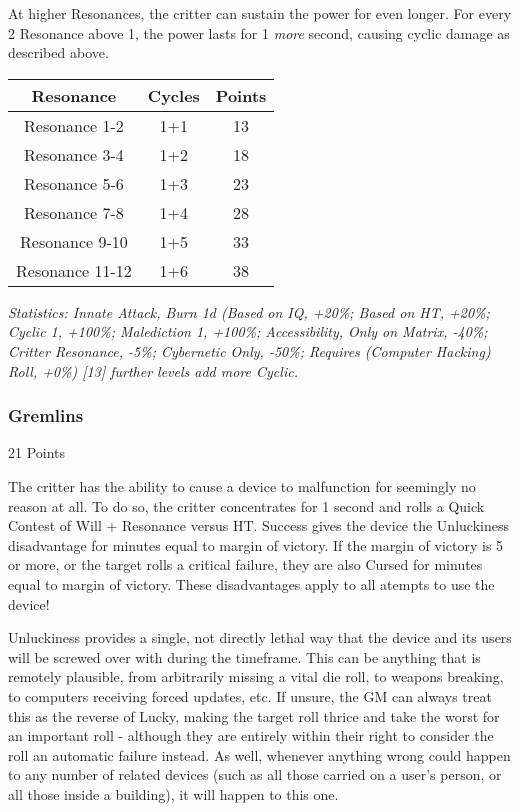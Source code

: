 \begin{multicols*}{3}
	At higher Resonances, the critter can sustain the power for even longer. For every 2 Resonance above 1, the power lasts for 1 \textit{more} second, causing cyclic damage as described above.
	
	 	\begin{center}
	 	\begin{tabular}{|c|c|c|}
	 		\hline
	 		Resonance & Cycles & Points \\
	 		\hline
	 		\hline
	 		Resonance 1-2 & 1+1 & 13 \\
	 		Resonance 3-4 & 1+2 & 18 \\
	 		Resonance 5-6 & 1+3 & 23 \\
	 		Resonance 7-8 & 1+4 & 28 \\
	 		Resonance 9-10 & 1+5 & 33 \\
	 		Resonance 11-12 & 1+6 & 38 \\
	 		\hline
	 	\end{tabular}
	 \end{center}

	\textcolor{OliveGreen}{\textit{Statistics: Innate Attack, Burn 1d (Based on IQ, +20\%; Based on HT, +20\%; Cyclic 1, +100\%; Malediction 1, +100\%; Accessibility, Only on Matrix, -40\%; Critter Resonance, -5\%; Cybernetic Only, -50\%; Requires (Computer Hacking) Roll, +0\%) [13] further levels add more Cyclic.}}

	\subsubsection{Gremlins}\label{gremlins}
	\begin{flushright}
		21 Points
	\end{flushright}

	The critter has the ability to cause a device to malfunction for seemingly no reason at all. To do so, the critter concentrates for 1 second and rolls a Quick Contest of Will + Resonance versus HT. Success gives the device the Unluckiness disadvantage for minutes equal to margin of victory. If the margin of victory is 5 or more, or the target rolls a critical failure, they are also Cursed for minutes equal to margin of victory. These disadvantages apply to all atempts to use the device!
	
	Unluckiness provides a single, not directly lethal way that the device and its users will be screwed over with during the timeframe. This can be anything that is remotely plausible, from arbitrarily missing a vital die roll, to weapons breaking, to computers receiving forced updates, etc. If unsure, the GM can always treat this as the reverse of Lucky, making the target roll thrice and take the worst for an important roll - although they are entirely within their right to consider the roll an automatic failure instead. As well, whenever anything wrong could happen to any number of related devices (such as all those carried on a user's person, or all those inside a building), it will happen to this one.
	

\end{multicols*}
